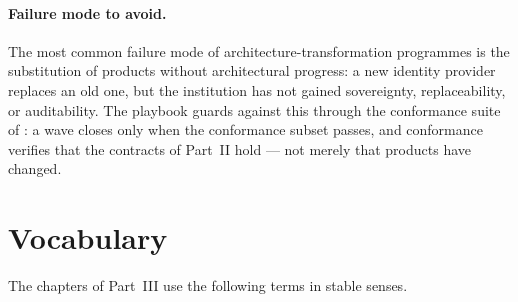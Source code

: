 \paragraph{Failure mode to avoid.} The most common failure mode
of architecture-transformation programmes is the substitution of
products without architectural progress: a new identity provider
replaces an old one, but the institution has not gained
sovereignty, replaceability, or auditability. The playbook
guards against this through the conformance suite of
: a wave closes only when the
conformance subset passes, and conformance verifies that the
contracts of Part~II hold --- not merely that products have
changed.

\section{Vocabulary}
\label{sec:pr-vocabulary}

The chapters of Part~III use the following terms in stable senses.

